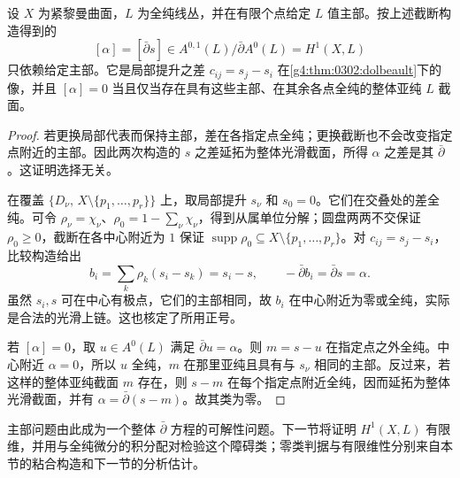 \begin{proposition}
\label{g4:prop:0302:principal-parts-class}
设 \(X\) 为紧黎曼曲面，\(L\) 为全纯线丛，并在有限个点给定 \(L\) 值主部。按上述截断构造得到的
\[
 [\alpha]=[\bar\partial s]\in
 A^{0,1}(L)/\bar\partial A^0(L)=H^1(X,L)
\]
只依赖给定主部。它是局部提升之差 \(c_{ij}=s_j-s_i\) 在\cref{g4:thm:0302:dolbeault}下的像，并且 \([\alpha]=0\) 当且仅当存在具有这些主部、在其余各点全纯的整体亚纯 \(L\) 截面。
\end{proposition}
\begin{proof}
若更换局部代表而保持主部，差在各指定点全纯；更换截断也不会改变指定点附近的主部。因此两次构造的 \(s\) 之差延拓为整体光滑截面，所得 \(\alpha\) 之差是其 \(\bar\partial\)。这证明选择无关。

在覆盖 \(\{D_\nu,\,X\setminus\{p_1,\ldots,p_r\}\}\) 上，取局部提升 \(s_\nu\) 和 \(s_0=0\)。它们在交叠处的差全纯。可令 \(\rho_\nu=\chi_\nu\)、\(\rho_0=1-\sum_\nu\chi_\nu\)，得到从属单位分解；圆盘两两不交保证 \(\rho_0\geq0\)，截断在各中心附近为 \(1\) 保证 \(\operatorname{supp}\rho_0\subseteq X\setminus\{p_1,\ldots,p_r\}\)。对 \(c_{ij}=s_j-s_i\)，比较构造给出
\[
 b_i=\sum_k\rho_k(s_i-s_k)=s_i-s,
 \qquad -\bar\partial b_i=\bar\partial s=\alpha.
\]
虽然 \(s_i,s\) 可在中心有极点，它们的主部相同，故 \(b_i\) 在中心附近为零或全纯，实际是合法的光滑上链。这也核定了所用正号。

若 \([\alpha]=0\)，取 \(u\in A^0(L)\) 满足 \(\bar\partial u=\alpha\)。则 \(m=s-u\) 在指定点之外全纯。中心附近 \(\alpha=0\)，所以 \(u\) 全纯，\(m\) 在那里亚纯且具有与 \(s_\nu\) 相同的主部。反过来，若这样的整体亚纯截面 \(m\) 存在，则 \(s-m\) 在每个指定点附近全纯，因而延拓为整体光滑截面，并有 \(\alpha=\bar\partial(s-m)\)。故其类为零。
\end{proof}

主部问题由此成为一个整体 \(\bar\partial\) 方程的可解性问题。下一节将证明 \(H^1(X,L)\) 有限维，并用与全纯微分的积分配对检验这个障碍类；零类判据与有限维性分别来自本节的粘合构造和下一节的分析估计。

